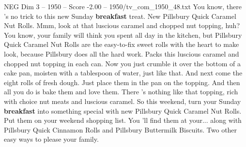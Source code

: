 \begin{textsample}{NEG Dim 3 – 1950 – Score -2.00 – 1950/tv\_com\_1950\_48.txt}  \label{ex:f3_neg_085}
You know, there 's no trick to this new Sunday \textbf{breakfast} treat.
New Pillsbury Quick Caramel Nut Rolls.
Mmm, look at that luscious caramel and chopped nut topping, huh?
You know, your family will think you spent all day in the kitchen, but Pillsbury Quick Caramel Nut Rolls are the easy-to-fix sweet rolls with the heart to make look, because Pillsbury does all the hard work.
Packs this luscious caramel and chopped nut topping in each can.
Now you just crumble it over the bottom of a cake pan, moisten with a tablespoon of water, just like that.
And next come the eight rolls of fresh dough.
Just place them in the pan on the topping.
And then all you do is bake them and love them.
There 's nothing like that topping, rich with choice nut meats and luscious caramel.
So this weekend, turn your Sunday \textbf{breakfast} into something special with new Pillsbury Quick Caramel Nut Rolls.
Put them on your weekend shopping list.
You 'll find them at your... along with Pillsbury Quick Cinnamon Rolls and Pillsbury Buttermilk Biscuits.
Two other easy ways to please your family.

\end{textsample}
